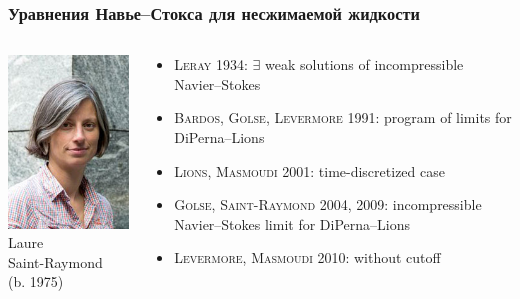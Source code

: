 \documentclass[mathserif]{beamer} %
\newcommand{\Cite}[2][]{\alert{\textsc{#2 #1}}}
\begin{document}
\begin{frame}
    \frametitle{Уравнения Навье--Стокса для несжимаемой жидкости}
    \begin{columns}
    \begin{column}{0.2\textwidth}
       \includegraphics[width=1.4\textwidth]{../boltzmann_math/photos/raymond}\\
       Laure\\\mbox{Saint-Raymond}\\(b. 1975)
    \end{column}
    \begin{column}{0.8\textwidth}
        \begin{itemize}
            \item \Cite[1934]{Leray}: \(\exists\) weak solutions of incompressible Navier--Stokes
            \item \Cite[1991]{Bardos, Golse, Levermore}: program of limits for DiPerna--Lions %
            \item \Cite[2001]{Lions, Masmoudi}: time-discretized case
            \item \Cite[2004, 2009]{Golse, Saint-Raymond}: incompressible Navier--Stokes limit for DiPerna--Lions
            \item \Cite[2010]{Levermore, Masmoudi}: without cutoff
        \end{itemize}
    \end{column}
    \end{columns}
\end{frame}
\end{document}
